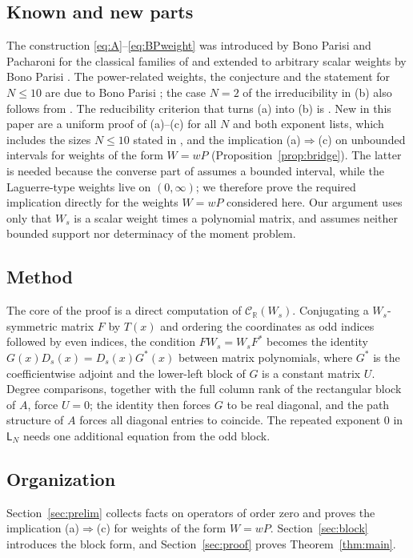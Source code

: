 \documentclass[11pt]{amsart}
\theoremstyle{definition}
\theoremstyle{remark}
\numberwithin{equation}{section}
\newcommand{\R}{\mathbb{R}}
\newcommand{\CR}{\mathcal{C}_{\R}}
\newcommand{\sL}{\mathsf{L}}
\begin{document}
\subsection*{Known and new parts}
The construction \eqref{eq:A}--\eqref{eq:BPweight} was introduced by Bono
Parisi and Pacharoni \cite{BPP} for the classical families of
\cite[Definition~1.1]{BPP} and extended to arbitrary scalar weights by Bono
Parisi \cite{BP26}. The power-related weights, the conjecture and the
statement for $N\le10$ are due to Bono Parisi \cite{BP26}; the case $N=2$ of
the irreducibility in (b) also follows from \cite[Proposition~5.1]{BP26}.
The reducibility criterion that turns (a) into (b) is
\cite[Theorem~2.8, Corollary~2.11]{TZ18}. New in this paper are a uniform
proof of (a)--(c) for all $N$ and both exponent lists, which includes the
sizes $N\le10$ stated in \cite{BP26}, and the implication (a)$\Rightarrow$(c)
on unbounded intervals for weights of the form $W=wP$
(Proposition~\ref{prop:bridge}). The latter is needed because the converse
part of \cite[Theorem~4.3]{TZ18} assumes a bounded interval, while the
Laguerre-type weights live on $(0,\infty)$; we therefore prove the required
implication directly for the weights $W=wP$ considered here. Our argument
uses only that $W_s$ is a scalar weight times a polynomial matrix, and
assumes neither bounded support nor determinacy of the moment problem.

\subsection*{Method}
The core of the proof is a direct computation of $\CR(W_s)$. Conjugating a
$W_s$-symmetric matrix $F$ by $T(x)$ and ordering the coordinates as odd
indices followed by even indices, the condition $FW_s=W_sF^*$ becomes the
identity $G(x)D_s(x)=D_s(x)G^*(x)$ between matrix polynomials, where $G^*$
is the coefficientwise adjoint and the lower-left block of $G$ is a constant
matrix $U$. Degree comparisons, together with the full column rank of the
rectangular block of $A$, force $U=0$; the identity then forces $G$ to be
real diagonal, and the path structure of $A$ forces all diagonal entries to
coincide. The repeated exponent $0$ in $\sL_N$ needs one
additional equation from the odd block.

\subsection*{Organization}
Section~\ref{sec:prelim} collects facts on operators of order zero and
proves the implication (a)$\Rightarrow$(c) for weights of the form $W=wP$. Section~\ref{sec:block} introduces the block form, and
Section~\ref{sec:proof} proves Theorem~\ref{thm:main}.
\end{document}
